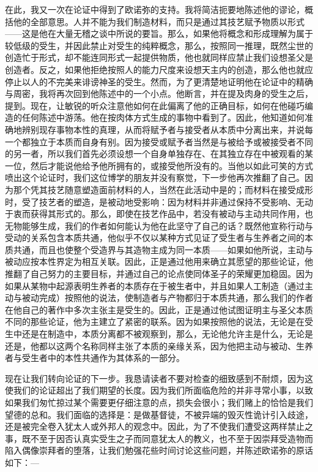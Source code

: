 在此，我又一次在论证中得到了欧诺弥的支持。我将简洁扼要地陈述他的谬论，概括他的全部意思。人并不能为我们制造材料，而只是通过其技艺赋予物质以形式——这是他在大量无稽之谈中所说的要旨。那么，如果他将概念和形成理解为属于较低级的受生，并因此禁止对受生的纯粹概念，那么，按照同一推理，既然尘世的创造忙于形式，却不能连同形式一起提供物质，他也就同样应禁止我们设想圣父是创造者。反之，如果他拒绝按照人的能力尺度来设想天主内的创造，那么他也就应停止以人的不完美来诽谤神圣的受生。然而，为了更清楚地证明他在论证中的精确与周密，我将再次回到他陈述中的一个小点。他断言，并在提及肉身的受生之后，提到。现在，让敏锐的听众注意他如何在此偏离了他的正确目标，如何在他碰巧编造的任何陈述中游荡。他在按肉体方式生成的事物中看到了。因此，他知道如何准确地辨别现存事物本性的真理，从而将赋予者与接受者从本质中分离出来，并说每一个都独立于本质而自身有别。因为接受或赋予者当然是与被给予或被接受者不同的另一者，所以我们首先必须设想一个自身单独存在、在其独立存在中被观看的某一位，然后才能说他给予他所拥有的，或接受他所没有的。当他以如此可笑的方式喷出这个论证时，我们这位博学的朋友并没有察觉，下一步他再次推翻了自己。因为那个凭其技艺随意塑造面前材料的人，当然在此活动中是的；而材料在接受成形时，受了技艺者的塑造，是被动地受影响：因为材料并非通过保持不受影响、无动于衷而获得其形式的。那么，即使在技艺作品中，若没有被动与主动共同作用，也无物能够生成，我们的作者如何能认为他在此坚守了自己的话？既然他宣称行动与受动的关系包含本质共通，他似乎不仅以某种方式见证了受生者与生养者之间的本质共通，而且也使整个受造界与其造物主成为同一本质——如果如他所说，主动与被动应按本性界定为相互关联。因此，正是通过他用来确立其愿望的那些论证，他推翻了自己努力的主要目标，并通过自己的论点使同体圣子的荣耀更加稳固。因为如果从某物中起源表明生养者的本质存在于被生者中，并且如果人工制造（通过主动与被动完成）按照他的说法，使制造者与产物都归于本质共通，那么我们的作者在他自己的著作中多次主张主是受生的。因此，正是通过他试图证明主与圣父本质不同的那些论证，他为主建立了紧密的联系。因为如果按照他的说法，无论是在受生中还是在制造中，本质分离都不被观察到，那么，无论他允许主是什么，无论是还是，他都以这两个名称同样主张了本质的亲缘关系，因为他把主动与被动、生养者与受生者中的本性共通作为其体系的一部分。\par

现在让我们转向论证的下一步。我恳请读者不要对检查的细致感到不耐烦，因为这使我们的论证超出了我们期望的长度。因为我们所面临危险的并非寻常小事，以致如果我们匆忙掠过某个需要更仔细注意的点，损失会很小；我们赌上的恰恰是我们望德的总和。我们面临的选择是：是做基督徒，不被异端的毁灭性诡计引入歧途，还是被完全卷入犹太人或外邦人的观念中。因此，为了不使我们遭受这两样禁止之事，既不至于因否认真实受生之子而同意犹太人的教义，也不至于因崇拜受造物而陷入偶像崇拜者的堕落，让我们勉强花些时间讨论这些问题，并陈述欧诺弥的原话如下：—\par

